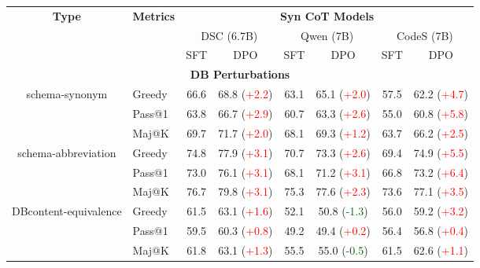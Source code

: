 \begin{table*}[t!]
    \centering
\begin{adjustbox}{max width=\textwidth}
    \begin{tabular}{c | l | c c | c c | c c }
        \toprule
         \multirow{3}{*}{\textbf{Type}} & \multirow{3}{*}{\textbf{Metrics}} & \multicolumn{6}{c}{\textbf{Syn CoT Models}} \\ \cline{3-8}
         & & \multicolumn{2}{c}{DSC (6.7B)} & \multicolumn{2}{c}{Qwen (7B)} & \multicolumn{2}{c}{CodeS (7B)} \\ \cline{3-8}
         & & SFT & DPO & SFT & DPO & SFT & DPO \\ \midrule
        \multicolumn{8}{c}{\textbf{DB Perturbations}} \\ \midrule

        \multirow{3}{*}{schema-synonym} & Greedy & 66.6 & 68.8 (\textcolor{red}{+2.2}) & 63.1 & 65.1 (\textcolor{red}{+2.0}) & 57.5 & 62.2 (\textcolor{red}{+4.7}) \\
        & Pass@1 & 63.8 & 66.7 (\textcolor{red}{+2.9}) & 60.7 & 63.3 (\textcolor{red}{+2.6}) & 55.0 & 60.8 (\textcolor{red}{+5.8}) \\
        & Maj@K & 69.7 & 71.7 (\textcolor{red}{+2.0}) & 68.1 & 69.3 (\textcolor{red}{+1.2}) & 63.7 & 66.2 (\textcolor{red}{+2.5}) \\
         \midrule

        \multirow{3}{*}{schema-abbreviation} & Greedy & 74.8 & 77.9 (\textcolor{red}{+3.1}) & 70.7 & 73.3 (\textcolor{red}{+2.6}) & 69.4 & 74.9 (\textcolor{red}{+5.5}) \\
        & Pass@1 & 73.0 & 76.1 (\textcolor{red}{+3.1}) & 68.1 & 71.2 (\textcolor{red}{+3.1}) & 66.8 & 73.2 (\textcolor{red}{+6.4}) \\
        & Maj@K & 76.7 & 79.8 (\textcolor{red}{+3.1}) & 75.3 & 77.6 (\textcolor{red}{+2.3}) & 73.6 & 77.1 (\textcolor{red}{+3.5}) \\
        \midrule


        \multirow{3}{*}{DBcontent-equivalence} & Greedy & 61.5 & 63.1 (\textcolor{red}{+1.6}) & 52.1 & 50.8 (\textcolor{darkgreen}{-1.3}) & 56.0 & 59.2 (\textcolor{red}{+3.2}) \\
        & Pass@1 & 59.5 & 60.3 (\textcolor{red}{+0.8}) & 49.2 & 49.4 (\textcolor{red}{+0.2}) & 56.4 & 56.8 (\textcolor{red}{+0.4}) \\
        & Maj@K & 61.8 & 63.1 (\textcolor{red}{+1.3}) & 55.5 & 55.0 (\textcolor{darkgreen}{-0.5}) & 61.5 & 62.6 (\textcolor{red}{+1.1}) \\
      \midrule


\end{tabular}
\end{adjustbox}
\end{table*}
